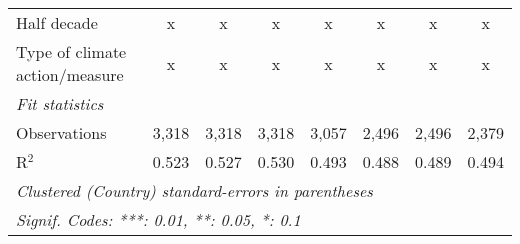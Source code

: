 \begin{tabular}{lccccccc}
   Half decade                                                                       & x            & x            & x             & x             & x              & x              & x\\  
   Type of climate action/measure                                                    & x            & x            & x             & x             & x              & x              & x\\  
   \midrule \emph{Fit statistics}\\
   Observations                                                                      & 3,318        & 3,318        & 3,318         & 3,057         & 2,496          & 2,496          & 2,379\\  
   R$^2$                                                                             & 0.523        & 0.527        & 0.530         & 0.493         & 0.488          & 0.489          & 0.494\\  
   \midrule
   \multicolumn{8}{l}{\emph{Clustered (Country) standard-errors in parentheses}}\\
   \multicolumn{8}{l}{\emph{Signif. Codes: ***: 0.01, **: 0.05, *: 0.1}}\\
\end{tabular}
\par\endgroup


